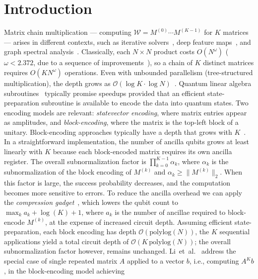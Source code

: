 \documentclass[a4paper,UKenglish,cleveref,autoref,thm-restate]{socg-lipics-v2021}
\begin{document}
\section{Introduction}
\label{sec:intro}
Matrix chain multiplication --- computing
$\mathcal{W} = M^{(0)} \cdots M^{(K-1)}$ for $K$ matrices --- arises in different contexts, such as
iterative solvers~\cite{GolubVanLoan1996}, deep feature maps~\cite{biamonte2017quantum}, and graph spectral
analysis~\cite{janzing610235bqp,nghiem2023quantum}.
Classically, each $N\!\times\! N$ product costs $O(N^\omega)$ ($\omega < 2.372$, due to a sequence of
improvements~\cite{Bini1979,alman2021refined,duan2023faster}), so a chain of $K$ distinct matrices requires $O(K N^\omega)$ operations. Even with unbounded parallelism (tree-structured multiplication), the depth grows as $\mathcal{O}(\log K \cdot \log N)$~\cite{GolubVanLoan1996}. Quantum linear algebra subroutines~\cite{harrow2009quantum,PhysRevLett.120.050502,biamonte2017quantum} typically promise speedups provided that an efficient state-preparation subroutine is available to encode the data into quantum states.
Two encoding models are relevant: \emph{statevector encoding}, where
matrix entries appear as amplitudes, and \emph{block-encoding}, where the matrix is the top-left block of a unitary. Block-encoding approaches
typically have a depth that grows with $K$~\cite{chakraborty_et_al:LIPIcs.ICALP.2019.33}. In a straightforward implementation, the number of ancilla qubits grows at least linearly with $K$ because each block-encoded matrix requires its own ancilla register. The overall subnormalization factor is $\prod_{k=0}^{K-1} \alpha_k$, where $\alpha_k$ is the subnormalization of the block encoding of $M^{(k)}$ and $\alpha_k\ge \|M^{(k)}\|_2$. When this factor is large, the success probability decreases, and the computation becomes more sensitive to errors. To reduce the ancilla overhead we can apply the \emph{compression gadget}~\cite{Fang_2023}, which lowers the qubit count to $\max_k a_k + \log(K) + 1$, where $a_k$ is the number of ancillae required to block-encode $M^{(k)}$, at the expense of increased circuit depth. Assuming efficient state-preparation, each block encoding has depth $\mathcal{O}(\mathrm{polylog}(N))$, the $K$ sequential applications yield a total circuit depth of $\mathcal{O}(K\,\mathrm{polylog}(N))$; the overall subnormalization factor however, remains unchanged. Li~et~al.~\cite{li2025faster} address the special case of single repeated matrix $A$ applied to a vector $b$, i.e., computing $A^K b$, in the block-encoding model achieving
\end{document}

